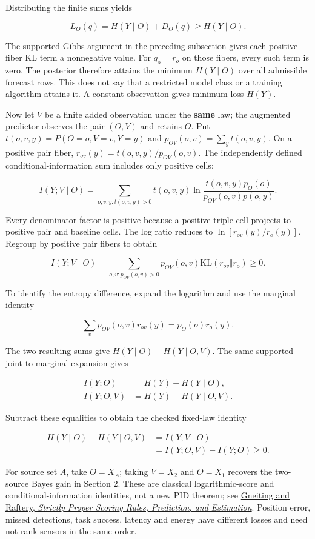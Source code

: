 \documentclass[11pt,a4paper]{article}
\begin{document}
Distributing the finite sums yields

\[
\boxed{L_O(q)=H(Y\mid O)+D_O(q)\geq H(Y\mid O).}
\]

The supported Gibbs argument in the preceding subsection gives each positive-fiber KL term a nonnegative value. For \(q_o=r_o\) on those fibers, every such term is zero. The posterior therefore attains the minimum \(H(Y\mid O)\) over all admissible forecast rows. This does not say that a restricted model class or a training algorithm attains it. A constant observation gives minimum loss \(H(Y)\).

Now let \(V\) be a finite added observation under the \textbf{same} law; the augmented predictor observes the pair \((O,V)\) and retains \(O\). Put \(t(o,v,y)=P(O=o,V=v,Y=y)\) and \(p_{OV}(o,v)=\sum_y t(o,v,y)\). On a positive pair fiber, \(r_{ov}(y)=t(o,v,y)/p_{OV}(o,v)\). The independently defined conditional-information sum includes only positive cells:

\[
I(Y;V\mid O)=\sum_{o,v,y:t(o,v,y)>0}t(o,v,y)
\ln\frac{t(o,v,y)p_O(o)}{p_{OV}(o,v)p(o,y)}.
\]

Every denominator factor is positive because a positive triple cell projects to positive pair and baseline cells. The log ratio reduces to \(\ln[r_{ov}(y)/r_o(y)]\). Regroup by positive pair fibers to obtain

\[
I(Y;V\mid O)=\sum_{o,v:p_{OV}(o,v)>0}p_{OV}(o,v)
\mathrm{KL}(r_{ov}\Vert r_o)\geq0.
\]

To identify the entropy difference, expand the logarithm and use the marginal identity

\[
\sum_v p_{OV}(o,v)r_{ov}(y)=p_O(o)r_o(y).
\]

The two resulting sums give \(H(Y\mid O)-H(Y\mid O,V)\). The same supported joint-to-marginal expansion gives

\[
\begin{aligned}
I(Y;O)&=H(Y)-H(Y\mid O),\\
I(Y;O,V)&=H(Y)-H(Y\mid O,V).
\end{aligned}
\]

Subtract these equalities to obtain the checked fixed-law identity

\[
\boxed{\begin{aligned}
H(Y\mid O)-H(Y\mid O,V)
&=I(Y;V\mid O)\\
&=I(Y;O,V)-I(Y;O)\geq0.
\end{aligned}}
\]

For source set \(A\), take \(O=X_A\); taking \(V=X_2\) and \(O=X_1\) recovers the two-source Bayes gain in Section 2. These are classical logarithmic-score and conditional-information identities, not a new PID theorem; see \href{https://doi.org/10.1198/016214506000001437}{Gneiting and Raftery, \emph{Strictly Proper Scoring Rules, Prediction, and Estimation}}. Position error, missed detections, task success, latency and energy have different losses and need not rank sensors in the same order.
\end{document}
